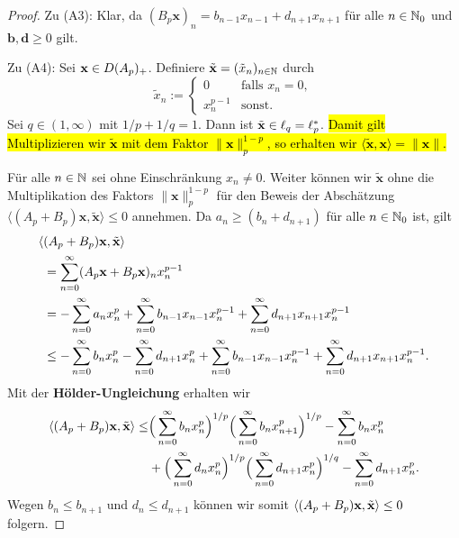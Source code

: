 \begin{proof}
\par
Zu (A3): Klar, da $(B_p\textbf{x})_n=b_{n-1}x_{n-1}+d_{n+1}x_{n+1}$ für alle $n\in\mathbb{N}_0$ und $\textbf{b},\textbf{d}\geq0$ gilt.

\par
Zu (A4): Sei $\textnormal{\textbf{x}}\in D(A_p)_+$. Definiere $\tilde{\textnormal{\textbf{x}}} = (\tilde x_n)_{n\in\mathbb{N}}$ durch
\begin{equation*}
\tilde x_n := 
\begin{cases}
0\quad&\text{falls }x_n=0,\\
x_n^{p-1}&\text{sonst.}
\end{cases}
\end{equation*}
Sei $q\in(1,\infty)$ mit $1/p + 1/q=1$. Dann ist $\tilde{\textnormal{\textbf{x}}}\in \ell_q=\ell_p^*$. \hl{Damit gilt  Multiplizieren wir $\tilde{\textbf{x}}$ mit dem Faktor $\|\textbf{x}\|_p^{1-p}$, so erhalten wir  $\langle \tilde{\textbf{x}},\textbf{x}\rangle = \|\textbf{x}\|$. }

\par
Für alle $n\in\mathbb{N}$ sei ohne Einschränkung $x_n\neq 0$. Weiter können wir  $\tilde{\textbf{x}}$ ohne die Multiplikation des Faktors $\|\textbf{x}\|_p^{1-p}$ für den Beweis der Abschätzung $\langle(A_p+B_p)\textbf{x} ,\tilde{\textbf{x}} \rangle\leq0$ annehmen. Da $a_n\geq (b_n + d_{n+1})$ für alle $n\in\mathbb{N}_0$ ist, gilt
\begin{align*}
\langle &(A_p+B_p)\textnormal{\textbf{x}}, \tilde{\textnormal{\textbf{x}}}\rangle\\
&= \sum_{n=0}^\infty (A_p\textnormal{\textbf{x}}+B_p\textnormal{\textbf{x}})_n x_n^{p-1}\\
&= -\sum_{n=0}^\infty a_n x_n^{p} + \sum_{n=0}^\infty b_{n-1} x_{n-1} x_n^{p-1} + \sum_{n=0}^\infty d_{n+1} x_{n+1}x_n^{p-1}\\
&\leq -\sum_{n=0}^\infty b_n x_n^p - \sum_{n=0}^\infty d_{n+1}x_n^p +\sum_{n=0}^\infty b_{n-1} x_{n-1} x_n^{p-1} + \sum_{n=0}^\infty d_{n+1}x_{n+1} x_n^{p-1}.
\end{align*}
Mit der \index{}\textbf{Hölder-Ungleichung} erhalten wir
\begin{align*}
\langle (A_p+B_p)\textnormal{\textbf{x}}, \tilde{\textbf{x}}\rangle 
\leq &\Big(\sum_{n=0}^\infty b_n x_n^p\Big)^{1/p}\Big(\sum_{n=0}^\infty b_n x_{n+1}^p\Big)^{1/p} - \sum_{n=0}^\infty b_n x_n^p\\
& + \Big(\sum_{n=0}^\infty d_n x_n^p \Big)^{1/p}\Big(\sum_{n=0}^\infty d_{n+1}x_n^p\Big)^{1/q} - \sum_{n=0}^\infty d_{n+1} x_n^p.
\end{align*}
Wegen $b_n\leq b_{n+1}$ und  $d_n\leq d_{n+1}$ können wir somit  $\langle (A_p+B_p)\textnormal{\textbf{x}}, \tilde{\textnormal{\textbf{x}}}\rangle \leq 0$ folgern.
\end{proof}

